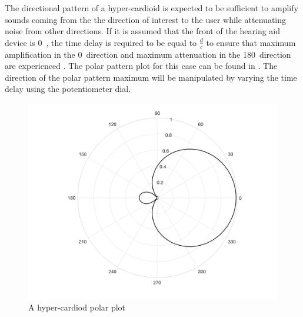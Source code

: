 \documentclass[10pt,twocolumn]{witseiepaper}
\begin{document}
The directional pattern of a hyper-cardioid is expected to be sufficient to amplify sounds coming from the the direction of interest to the user while attenuating noise from other directions. If it is assumed that the front of the hearing aid device is 0\textdegree\ , the time delay is required to be equal to $\frac{d}{c}$ to ensure that maximum amplification in the 0\textdegree\ direction and maximum attenuation in the 180\textdegree\ direction are experienced \cite{Distortion_of_interaural_time_cues}. The polar pattern plot for this case can be found in . The direction of the polar pattern maximum will be manipulated by varying the time delay using the potentiometer dial. 

\begin{figure}[h]
	\centering
	\includegraphics[width=0.9\columnwidth]{polarPlot.png}
	\caption{A hyper-cardiod polar plot}
	\raggedright
	\label{fig:polar}	
\end{figure}
\end{document}
